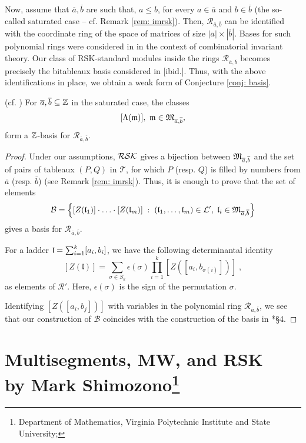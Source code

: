\documentclass{ert-l} %
\begin{document}
Now, assume that $\overline{a},\overline{b}$ are such that, $a\leq b$, for every $a\in \overline{a}$ and $b\in \overline{b}$
(the so-called saturated case -- cf. Remark \ref{rem: imrsk}).
Then, $\mathcal{R}_{\overline{a},\overline{b}}$ can be identified with the coordinate ring of the space of matrices of size $|\overline{a}|\times |\overline{b}|$.
Bases for such polynomial rings were considered in \cites{MR0498650, MR0485944} in the context of combinatorial invariant theory.
Our class of RSK-standard modules inside the rings $\mathcal{R}_{\overline{a},\overline{b}}$ becomes precisely the bitableaux basis considered in [ibid.].
Thus, with the above identifications in place, we obtain a weak form of Conjecture \ref{conj: basis}.
\begin{proposition} (cf. \cites{MR0498650, MR0485944, 1605.06696}) \label{prop: basis-rota}
For $\overline{a}, \overline{b}\subseteq \mathbb{Z}$ in the saturated case, the classes
\[
[\std(\m)],\ \m\in\Mult_{\overline{a},\overline{b}},
\]
form a $\mathbb{Z}$-basis for $\mathcal{R}_{\overline{a},\overline{b}}$.
\end{proposition}

\begin{proof}
Under our assumptions, $\mathcal{RSK}$ gives a bijection between $\mathfrak{M}_{\overline{a},\overline{b}}$ and the set of pairs of tableaux $(P,Q)$ in $\mathcal{T}$,
for which $P$ (resp. $Q$) is filled by numbers from $\overline{a}$ (resp. $\overline{b}$) (see Remark \ref{rem: imrsk}). Thus, it is enough to prove that the set of elements
\[
\mathcal{B} = \left\{ [Z(\mathfrak{l}_1)]\cdot\ldots\cdot[Z(\mathfrak{l}_m)]\;:\; (\mathfrak{l}_1,\ldots,\mathfrak{l}_m)\in \mathcal{L}',\; \mathfrak{l}_i\in \mathfrak{M}_{\overline{a},\overline{b}} \right\}
\]
gives a basis for $\mathcal{R}_{\overline{a},\overline{b}}$.

For a ladder $\mathfrak{l} = \sum_{i=1}^k [a_i,b_i]$, we have the following determinantal identity \cite{MR3163355}
\[
[Z(\mathfrak{l})] = \sum_{\sigma\in S_k} \epsilon(\sigma) \prod_{i=1}^k [Z([a_i, b_{\sigma(i)}])]\;,
\]
as elements of $\mathcal{R}'$. Here, $\epsilon(\sigma)$ is the sign of the permutation $\sigma$.

Identifying $[Z([a_i, b_j])]$ with variables in the polynomial ring $\mathcal{R}_{\overline{a},\overline{b}}$, we see that our construction of $\mathcal{B}$ coincides with the
construction of the basis in \cite{MR0485944}*{\S4}.
\end{proof}



\appendix


\section{Multisegments, MW, and \texorpdfstring{RSK\\by Mark Shimozono\footnote{Department of Mathematics,
Virginia Polytechnic Institute and State University; }}{}}
\label{sec:appendix}
\end{document}
